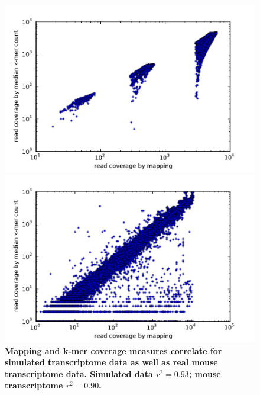 \documentclass{pnastwo}
\begin{document}
\begin{figure}[!ht]
\begin{center}
\centerline{\includegraphics[width=5in]{diginorm-sim-transcr.pdf}}
\centerline{\includegraphics[width=5in]{diginorm-mouse-transcr.pdf}}
\end{center}
\caption{
{\bf Mapping and k-mer coverage measures correlate for simulated transcriptome data as well as real mouse transcriptome data. Simulated data $r^2 = 0.93$;
mouse transcriptome $r^2 = 0.90$.}
}
\label{fig:transcripts}
\end{figure}
\end{document}
